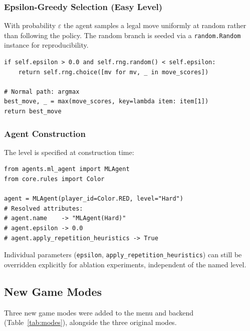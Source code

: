 \subsubsection{Epsilon-Greedy Selection (Easy Level)}

With probability $\varepsilon$ the agent samples a legal move uniformly
at random rather than following the policy.  The random branch is
seeded via a \texttt{random.Random} instance for reproducibility.

\begin{lstlisting}[caption={Epsilon-greedy branch in \texttt{select\_move}}]
if self.epsilon > 0.0 and self.rng.random() < self.epsilon:
    return self.rng.choice([mv for mv, _ in move_scores])

# Normal path: argmax
best_move, _ = max(move_scores, key=lambda item: item[1])
return best_move
\end{lstlisting}

\subsubsection{Agent Construction}

The level is specified at construction time:

\begin{lstlisting}[caption={Constructing \texttt{MLAgent} at a chosen level}]
from agents.ml_agent import MLAgent
from core.rules import Color

agent = MLAgent(player_id=Color.RED, level="Hard")
# Resolved attributes:
# agent.name    -> "MLAgent(Hard)"
# agent.epsilon -> 0.0
# agent.apply_repetition_heuristics -> True
\end{lstlisting}

Individual parameters (\texttt{epsilon},
\texttt{apply\_repetition\_heuristics}) can still be overridden
explicitly for ablation experiments, independent of the named level.

\subsection{New Game Modes}
\label{sec:modes}

Three new game modes were added to the menu and backend
(Table~\ref{tab:modes}), alongside the three original modes.

